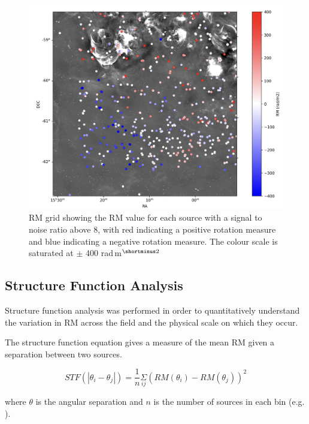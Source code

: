 \begin{figure}
    \centering
    \includegraphics[width=\linewidth]{Thesis_Template/Figures/rm_without_nebulae.png}

        \caption[RM Grid]{RM grid showing the RM value for each source with a signal to noise ratio above 8, with red indicating a positive rotation measure and blue indicating a negative rotation measure. The colour scale is saturated at $\pm$ 400 rad$\,$m$^{\shortminus2}$}
    \label{fig:1Grid}
\end{figure}



\subsection{Structure Function Analysis}

Structure function analysis was performed in order to quantitatively understand the variation in RM across the field and the physical scale on which they occur.

The structure function equation gives a measure of the mean RM given a separation between two sources.

\begin{equation}
    STF(|\theta_i - \theta_j|) = \frac{1}{n}\underset{ij}{\Sigma}(RM(\theta_i) - RM(\theta_j))^2
    \label{Structure Function}
\end{equation}

\noindent where $\theta$ is the angular separation and $n$ is the number of sources in each bin (e.g. \cite{simonetti_1986}).


